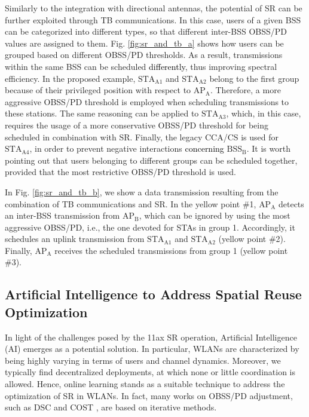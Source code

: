 \documentclass[preprint,12pt]{elsarticle}
\begin{document}
Similarly to the integration with directional antennas, the potential of SR can be further exploited through TB communications. In this case, users of a given BSS can be categorized into different types, so that different inter-BSS OBSS/PD values are assigned to them. Fig. \ref{fig:sr_and_tb_a} shows how users can be grouped based on different OBSS/PD thresholds. As a result, transmissions within the same BSS can be scheduled \textcolor{black}{differently}, thus improving spectral efficiency. In the proposed example, $\text{STA}_\text{A1}$ and $\text{STA}_\text{A2}$ belong to the first group because of their privileged position with respect to $\text{AP}_\text{A}$. Therefore, a more aggressive OBSS/PD threshold is employed when scheduling transmissions to these stations. The same reasoning can be applied to $\text{STA}_\text{A3}$, which, in this case, requires the usage of a more conservative OBSS/PD threshold for being scheduled in combination with SR. Finally, the legacy CCA/CS is used for $\text{STA}_\text{A4}$, in order to prevent negative interactions \textcolor{black}{concerning} $\text{BSS}_\text{B}$. It is worth pointing out that users belonging to different groups can be scheduled together, provided that the most restrictive OBSS/PD threshold is used. 

In Fig. \ref{fig:sr_and_tb_b}, we show a data transmission resulting from the combination of TB communications and SR. In the yellow point \#1, $\text{AP}_\text{A}$ detects an inter-BSS transmission from $\text{AP}_\text{B}$, which can be ignored by using the most aggressive OBSS/PD, i.e., the one devoted for STAs in group 1. Accordingly, it schedules an uplink transmission from $\text{STA}_\text{A1}$ and $\text{STA}_\text{A2}$ (yellow point \#2). Finally, $\text{AP}_\text{A}$ receives the scheduled transmissions from group 1 (yellow point \#3).

\subsection{Artificial Intelligence to Address Spatial Reuse Optimization}
In light of the challenges posed by the 11ax SR operation, Artificial Intelligence (AI) emerges as a potential solution. In particular, WLANs are characterized by being highly varying in terms of users and channel dynamics. Moreover, we typically find decentralized deployments, at which none or little coordination is allowed. Hence, online learning stands as a suitable technique to address the optimization of SR in WLANs. In fact, many works on OBSS/PD adjustment, such as DSC \cite{smith2015dynamic} and COST \cite{selinis2018control}, are based on iterative methods. 
\end{document}
